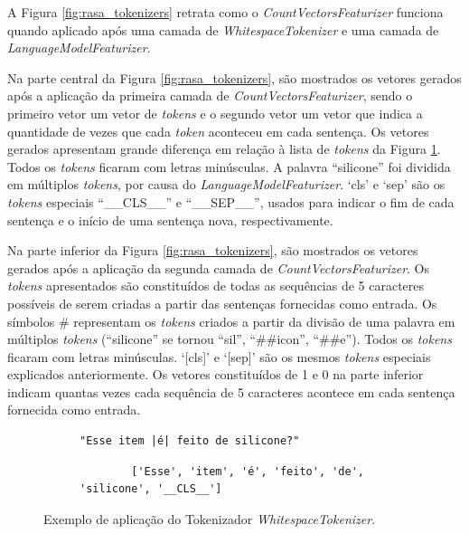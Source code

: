 \begin{itemize}
    A Figura \ref{fig:rasa_tokenizers} retrata como o \textit{CountVectorsFeaturizer} funciona quando aplicado após uma camada de \textit{WhitespaceTokenizer} e uma camada de \textit{LanguageModelFeaturizer}. 
    
    Na parte central da Figura \ref{fig:rasa_tokenizers}, são mostrados os vetores gerados após a aplicação da primeira camada de \textit{CountVectorsFeaturizer}, sendo o primeiro vetor um vetor de \textit{tokens} e o segundo vetor um vetor que indica a quantidade de vezes que cada \textit{token} aconteceu em cada sentença. Os vetores gerados apresentam grande diferença em relação à lista de \textit{tokens} da Figura \ref{fig:whitespace_tokenizer}. Todos os \textit{tokens} ficaram com letras minúsculas. A palavra ``silicone'' foi dividida em múltiplos \textit{tokens}, por causa do \textit{LanguageModelFeaturizer}. `cls' e `sep' são os \textit{tokens} especiais ``\_\_CLS\_\_'' e ``\_\_SEP\_\_'', usados para indicar o fim de cada sentença e o início de uma sentença nova, respectivamente.

    Na parte inferior da Figura \ref{fig:rasa_tokenizers}, são mostrados os vetores gerados após a aplicação da segunda camada de \textit{CountVectorsFeaturizer}. Os \textit{tokens} apresentados são constituídos de todas as sequências de 5 caracteres possíveis de serem criadas a partir das sentenças fornecidas como entrada. Os símbolos \# representam os \textit{tokens} criados a partir da divisão de uma palavra em múltiplos \textit{tokens} (``silicone'' se tornou ``sil'', ``\#\#icon'', ``\#\#e''). Todos os \textit{tokens} ficaram com letras minúsculas. `[cls]' e `[sep]' são os mesmos \textit{tokens} especiais explicados anteriormente. Os vetores constituídos de 1 e 0 na parte inferior indicam quantas vezes cada sequência de 5 caracteres acontece em cada sentença fornecida como entrada.
    
\end{itemize}

\begin{figure}[!ht]
    \begin{subfigure}{\linewidth}
        \centering
        \begin{lstlisting}[style=python]
        "Esse item |é| feito de silicone?"
        \end{lstlisting}
    \end{subfigure}
    
    \begin{subfigure}{\linewidth}
        \centering
        \begin{verbatim}
        ['Esse', 'item', 'é', 'feito', 'de', 'silicone', '__CLS__']
        \end{verbatim}
    \end{subfigure}
    
    \caption{Exemplo de aplicação do Tokenizador \textit{WhitespaceTokenizer}.}
    \label{fig:whitespace_tokenizer}
\end{figure}

